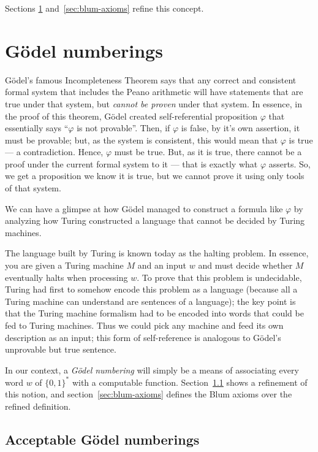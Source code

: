 \documentclass[12pt]{article}
\theoremstyle{definition}
\begin{document}
Sections \ref{sec:godel_numberings} and~\ref{sec:blum-axioms}
refine this concept.

\section{Gödel numberings}
\label{sec:godel_numberings}


Gödel's famous Incompleteness Theorem says that
any correct and consistent formal system that includes the Peano arithmetic
will have statements that are true under that system,
but \emph{cannot be proven} under that system.
In essence,
in the proof of this theorem,
Gödel created self-referential proposition $\varphi$
that essentially says ``$\varphi$ is not provable''.
Then, if $\varphi$ is false,
by it's own assertion, it must be provable;
but, as the system is consistent,
this would mean that $\varphi$ is true
--- a contradiction.
Hence, $\varphi$ must be true.
But, as it is true,
there cannot be a proof under the current formal system to it
--- that is exactly what $\varphi$ asserts.
So,
we get a proposition we know it is true,
but we cannot prove it using only tools of that system.

We can have a glimpse at how Gödel managed to construct a formula like $\varphi$
by analyzing how Turing constructed a language
that cannot be decided by Turing machines.

The language built by Turing is known today as the halting problem.
In essence,
you are given a Turing machine $M$ and an input $w$
and must decide whether $M$ eventually halts when processing $w$.
To prove that this problem is undecidable,
Turing had first to somehow encode this problem as a language
(because all a Turing machine can understand are sentences of a language);
the key point is that the Turing machine formalism
had to be encoded into words that could be fed to Turing machines.
Thus we could pick any machine and feed its own description as an input;
this form of self-reference is analogous
to Gödel's unprovable but true sentence.

In our context,
a \emph{Gödel numbering} will simply be a means
of associating every word $w$ of $\{0, 1\}^*$
with a computable function.
Section~\ref{sec:acceptable-godel-numberings} shows a refinement of this notion,
and section~\ref{sec:blum-axioms}
defines the Blum axioms over the refined definition.

\subsection{Acceptable Gödel numberings}
\label{sec:acceptable-godel-numberings}
\end{document}
